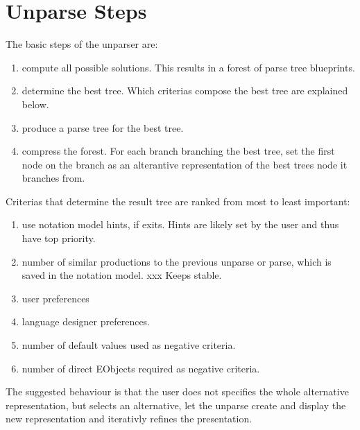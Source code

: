 \section{Unparse Steps}
The basic steps of the unparser are:
\begin{enumerate}
	\item compute all possible solutions. This results in a forest of parse tree blueprints.
	\item determine the best tree. Which criterias compose the best tree are explained below.
	\item produce a parse tree for the best tree. 
	\item compress the forest. For each branch branching the best tree, set the first node on the branch as an alterantive representation of the best trees node it branches from.
\end{enumerate}

Criterias that determine the result tree are ranked from most to least important:
\begin{enumerate}
	\item use notation model hints, if exits. Hints are likely set by the user and thus have top priority.
	\item number of similar productions to the previous unparse or parse, which is saved in the notation model. xxx Keeps stable.
	\item user preferences
	\item language designer preferences.
	\item number of default values used as negative criteria.
	\item number of direct EObjects required as negative criteria.
\end{enumerate}


The suggested behaviour is that the user does not specifies the whole alternative representation, but selects an alternative, let the unparse create and display the new representation and iterativly refines the presentation. 